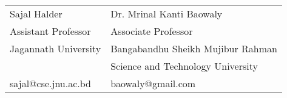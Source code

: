 \documentclass[]{deedy-resume-openfont}
\begin{document}
\begin{minipage}[t]{0.66\textwidth}



\begin{tabular}{ll}
	Sajal Halder & Dr. Mrinal Kanti Baowaly\\
	Assistant Professor & Associate Professor\\
	Jagannath University & Bangabandhu Sheikh Mujibur Rahman\\
	& Science and Technology University \\
	sajal@cse.jnu.ac.bd & baowaly@gmail.com\\
\end{tabular}

\sectionsep

\end{minipage} 
\end{document}
